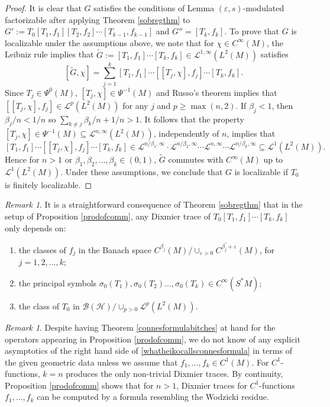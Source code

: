 \documentclass[10pt]{amsart}
\theoremstyle{remark}
\newtheorem{remark}[thm]{Remark}
\theoremstyle{definition}
\begin{document}
\begin{proof}
It is clear that $G$ satisfies the conditions of Lemma $({\varepsilon},s)$-modulated factorizable after applying Theorem \ref{sobregthm} to $G':=T_0[T_1,f_1][T_2,f_2]\cdots [T_{k-1},f_{k-1}]$ and $G''=[T_k,f_k]$. To prove that $G$ is localizable under the assumptions above, we note that for $\chi\in C^\infty(M)$, the Leibniz rule implies that $\tilde{G}:=[T_1,f_1]\cdots [T_k,f_k]\in \mathcal{L}^{1,\infty}(L^2(M))$ satisfies
$$[\tilde{G},\chi]=\sum_{j=1}^k [T_1,f_1]\cdots [[T_j,\chi],f_j]\cdots [T_k,f_k].$$
Since $T_j\in \Psi^0(M)$, $[T_j,\chi]\in \Psi^{-1}(M)$ and Russo's theorem \cite{russo} implies that $[[T_j,\chi],f_j]\in\mathcal{L}^{p}(L^2(M))$ for any $j$ and $p\geq\max(n,2)$. If $\beta_j<1$, then $\beta_j/n<1/n$ so $\sum_{k\neq j}\beta_k/n+1/n>1$. It follows that the property $[T_j,\chi]\in \Psi^{-1}(M)\subseteq \mathcal{L}^{n,\infty}(L^2(M))$, independently of $n$, implies that
$$[T_1,f_1]\cdots [[T_j,\chi],f_j]\cdots [T_k,f_k]\in \mathcal{L}^{n/\beta_1,\infty}\cdot\mathcal{L}^{n/\beta_2,\infty} \cdots \mathcal{L}^{n,\infty}\cdots\mathcal{L}^{n/\beta_k,\infty}\subseteq \mathcal{L}^1(L^2(M)).$$
Hence for $n>1$ or $\beta_1,\beta_2,\ldots, \beta_k\in (0,1)$, $\tilde{G}$ commutes with $C^\infty(M)$ up to $\mathcal{L}^1(L^2(M))$. Under these assumptions, we conclude that $G$ is localizable if $T_0$ is finitely localizable.
\end{proof}

\begin{remark}
It is a straightforward consequence of Theorem \ref{sobregthm} that in the setup of Proposition \ref{prodofcomm}, any Dixmier trace of $T_0[T_1,f_1]\cdots [T_k,f_k]$ only depends on:
\begin{enumerate}
\item the classes of $f_j$ in the Banach space $C^{\beta_j}(M)/\overline{\cup_{{\varepsilon}>0}C^{\beta_j+{\varepsilon}}(M)}$, for $j=1,2,\ldots, k$;
\item the principal symbols $\sigma_0(T_1), \sigma_0(T_2)..., \sigma_0(T_k)\in C^\infty(S^*M)$;
\item the class of $T_0$ in ${\mathcal{B}}({\mathcal{H}})/ \cup_{p>0}\mathcal{L}^{p}(L^2(M))$.
\end{enumerate}
\end{remark}

\begin{remark}
Despite having Theorem \ref{connesformulabitches} at hand for the operators appearing in Proposition \ref{prodofcomm}, we do not know of any explicit asymptotics of the right hand side of \eqref{whatheikocallsconnesformula} in terms of the given geometric data unless we assume that $f_1,..., f_k\in C^1(M)$. For $C^1$-functions, $k=n$ produces the only non-trivial Dixmier traces. By continuity, Proposition \ref{prodofcomm} shows that for $n>1$, Dixmier traces for $C^1$-functions $f_1,...,f_k$ can be computed by a formula resembling the Wodzicki residue.
\end{remark}
\end{document}
